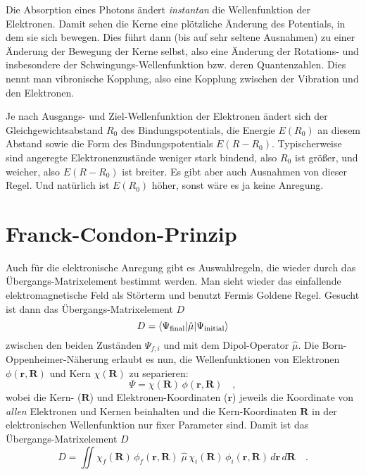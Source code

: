 Die Absorption eines Photons ändert \emph{instantan} die Wellenfunktion der Elektronen. Damit sehen die Kerne eine plötzliche Änderung des Potentials, in dem sie sich bewegen. Dies führt dann (bis auf sehr seltene Ausnahmen) zu einer Änderung der Bewegung der Kerne selbst, also eine Änderung der Rotations- und insbesondere der Schwingungs-Wellenfunktion bzw. deren Quantenzahlen. Dies nennt man vibronische Kopplung, also eine Kopplung zwischen der Vibration und den Elektronen.

Je nach Ausgangs- und Ziel-Wellenfunktion der Elektronen ändert sich der Gleichgewichtsabstand $R_0$ des Bindungspotentials,  die Energie $E(R_0)$ an diesem 
Abstand sowie die Form des Bindungspotentials $E(R- R_0)$. Typischerweise  sind angeregte Elektronenzustände weniger stark bindend, also $R_0$ ist größer, und weicher, also $E(R- R_0)$ ist breiter. Es gibt aber auch Ausnahmen von dieser Regel.
Und natürlich ist $E(R_0)$ höher, sonst wäre es ja keine Anregung.

\section{Franck-Condon-Prinzip}


Auch für die elektronische Anregung gibt es Auswahlregeln, die wieder durch das Übergangs-Matrixelement bestimmt werden. Man sieht wieder das einfallende elektromagnetische  Feld als Störterm und benutzt Fermis Goldene Regel. Gesucht ist dann das Übergangs-Matrixelement $D$
\begin{equation}
 D = \braket{\Psi_\text{final} | \hat{\mu} | \Psi_\text{initial} }
\end{equation}
zwischen den beiden Zuständen $\Psi_{f,i}$ und mit dem Dipol-Operator $ \hat{\mu}$. Die Born-Oppenheimer-Näherung erlaubt es nun, die Wellenfunktionen von Elektronen $ \phi(\mathbf{r}, \mathbf{R})$ und Kern $ \chi(\mathbf{R}) $ zu separieren:
\begin{equation}
 \Psi = \chi(\mathbf{R}) \, \phi(\mathbf{r}, \mathbf{R}) \quad , \label{eq:elec_wf_FC}
\end{equation}
wobei die Kern- ($\mathbf{R}$) und Elektronen-Koordinaten ($\mathbf{r}$) jeweils die Koordinate von \emph{allen} Elektronen und Kernen beinhalten und die Kern-Koordinaten $\mathbf{R}$ in der elektronischen Wellenfunktion nur fixer Parameter sind. Damit ist das Übergangs-Matrixelement $D$
\begin{equation}
 D =  \iint  \chi_f(\mathbf{R}) \, \phi_f(\mathbf{r} , \mathbf{R}) \; \hat{\mu}
 \,  \chi_i(\mathbf{R}) \, \phi_i(\mathbf{r}, \mathbf{R}) \, d \mathbf{r} \, d \mathbf{R}  \quad .
\end{equation}


